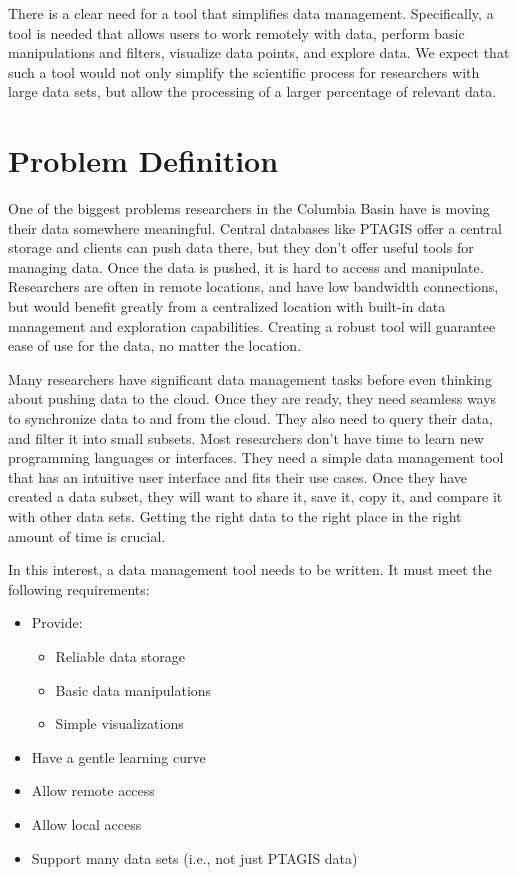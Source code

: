 There is a clear need for a tool that simplifies data management.  Specifically,
a tool is needed that allows users to work remotely with data, perform basic manipulations
and filters, visualize data points, and explore data.  We expect that such a
tool would not only simplify the scientific process for researchers with large
data sets, but allow the processing of a larger percentage of relevant data.

\section{Problem Definition}
One of the biggest problems researchers in the Columbia Basin have is moving
their data somewhere meaningful. Central databases like PTAGIS offer a 
central storage and clients can push data there, but they don't offer useful
tools for managing data. Once the data is pushed, it is hard to access and
manipulate. 
Researchers are often in remote locations, and have low bandwidth
connections, but would benefit greatly from a centralized location with 
built-in data management and exploration capabilities.
Creating a robust tool will guarantee ease of use for the data, no matter
the location.

Many researchers have significant data management tasks before even thinking 
about pushing data to the cloud. Once they are ready, they need seamless ways to
synchronize data to and from the cloud. They also need to query their data,
and filter it into small subsets. Most researchers don't have time to learn
new programming languages or interfaces. They need a simple data management tool 
that has an intuitive user 
interface and fits their use cases. Once they
have created a data subset, they will want to share it, save it, copy it, 
and compare it with other data sets. Getting the right data to the right place 
in the right amount of time is crucial.

In this interest, a data management tool needs to be written.  It must meet the
following requirements:

\singlespacing
\begin{itemize}
    \item Provide:
    \begin{itemize}
        \item Reliable data storage
         \item Basic data manipulations
         \item Simple visualizations
     \end{itemize}
     \item Have a gentle learning curve
     \item Allow remote access
     \item Allow local access
     \item Support many data sets (i.e.,  not just PTAGIS data)
 \end{itemize}

